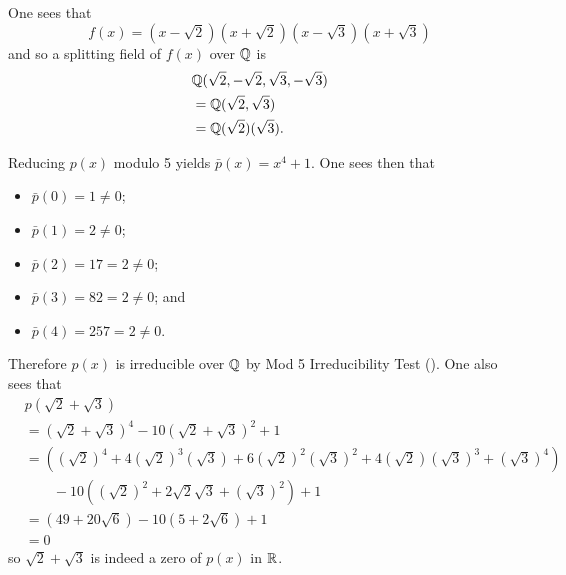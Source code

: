 \begin{questions}
    \item \begin{partquestions}{\roman*}
        \item One sees that
        \[
            f(x) = (x-\sqrt2)(x+\sqrt2)(x-\sqrt3)(x+\sqrt3)
        \]
        and so a splitting field of $f(x)$ over $\mathbb{Q}$ is
        \begin{align*}
            &\mathbb{Q}(\sqrt2, -\sqrt2, \sqrt3, -\sqrt3)\\
            &=\mathbb{Q}(\sqrt2, \sqrt3)\\
            &=\mathbb{Q}(\sqrt2)(\sqrt3).
        \end{align*}

        \item Reducing $p(x)$ modulo 5 yields $\bar{p}(x) = x^4 + 1$. One sees then that
        \begin{itemize}
            \item $\bar{p}(0) = 1 \neq 0$;
            \item $\bar{p}(1) = 2 \neq 0$;
            \item $\bar{p}(2) = 17 = 2 \neq 0$;
            \item $\bar{p}(3) = 82 = 2 \neq 0$; and
            \item $\bar{p}(4) = 257 = 2 \neq 0$.
        \end{itemize}
        Therefore $p(x)$ is irreducible over $\mathbb{Q}$ by Mod 5 Irreducibility Test (). One also sees that
        \begin{align*}
            &p(\sqrt2 + \sqrt3)\\
            &= (\sqrt2 + \sqrt3)^4 - 10(\sqrt2 + \sqrt3)^2 + 1\\
            &= \left((\sqrt2)^4 + 4(\sqrt2)^3(\sqrt3) + 6(\sqrt2)^2(\sqrt3)^2 + 4(\sqrt2)(\sqrt3)^3 + (\sqrt3)^4\right)\\
            &\quad\quad- 10\left((\sqrt2)^2 + 2\sqrt2\sqrt3 + (\sqrt3)^2\right) + 1\\
            &=\left(49 + 20\sqrt6\right) - 10\left(5 + 2\sqrt6\right) + 1\\
            &= 0
        \end{align*}
        so $\sqrt2 + \sqrt3$ is indeed a zero of $p(x)$ in $\mathbb{R}$.


\end{partquestions}
\end{questions}
